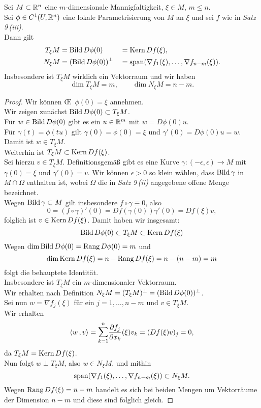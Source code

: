 \documentclass[skript.tex]{subfiles}
\begin{document}
	\begin{theorem}
		Sei $M\subset{\mathbb{R}^n}$ eine $m$-dimensionale Mannigfaltigkeit, $\xi \in M$, $m \leq n$.\\
		Sei $\phi \in C^1(U,{\mathbb{R}^n})$ eine lokale Parametrisierung von $M$ an $\xi$ und sei $f$ wie in \emph{Satz 9\,(iii)}.\\
		Dann gilt
		\begin{alignat*}{2}
			T_\xi M &= \operatorname{Bild} D\phi(0) &&=\operatorname{Kern} Df(\xi),\\
			N_\xi M &= (\operatorname{Bild} D\phi(0))^\perp &&=\operatorname{span}(\nabla f_1(\xi),\dotsc,\nabla f_{n-m}(\xi)).
		\end{alignat*}
		Insbesondere ist $T_\xi M$ wirklich ein Vektorraum und wir haben
		\[
			\dim T_\xi M = m, \qquad \dim N_\xi M = n-m.
		\]
	\end{theorem}
	\begin{proof}
		Wir können \OE\ $\phi(0) = \xi$ annehmen.\\
		Wir zeigen zunächst $\operatorname{Bild} D\phi(0) \subset T_\xi M$.\\
		Für $w\in\operatorname{Bild} D\phi(0)$ gibt es ein
		$u\in\mathbb{R}^m$ mit $w=D\phi(0)u$.\\
		Für $\gamma(t)=\phi(tu)$ gilt $\gamma(0) = \phi(0) = \xi$ und $\gamma'(0) = D\phi(0)u=w$.\\
		Damit ist $w \in T_\xi M$.\\
		Weiterhin ist $T_\xi M \subset \operatorname{Kern} Df(\xi)$.\\
		Sei hierzu $v \in T_\xi M$. Definitionsgemäß gibt es eine
		Kurve $\gamma \colon (-\epsilon,\epsilon) \to M$ mit $\gamma(0)=\xi$ und $\gamma'(0)=v$. Wir können $\epsilon>0$ so klein wählen, dass $\operatorname{Bild}\gamma$ in $M\cap\Omega$ enthalten ist, wobei $\Omega$ die
		in \emph{Satz 9\,(ii)} angegebene offene Menge bezeichnet.\\
		Wegen $\operatorname{Bild}\gamma \subset M$ gilt insbesondere
		$f\circ\gamma\equiv0$, also
		\[
			0 = (f\circ\gamma)'(0) = Df(\gamma(0))\gamma'(0) = Df(\xi)v,
		\]
		folglich ist $v \in \operatorname{Kern} Df(\xi)$. Damit haben wir insgesamt:
		\[
			\operatorname{Bild} D\phi(0) \subset T_\xi M \subset \operatorname{Kern} Df(\xi)
		\]
		Wegen $\dim\operatorname{Bild} D\phi(0) = \operatorname{\operatorname{Rang}} D\phi(0) = m$ und
		\[
			\dim\operatorname{Kern} Df(\xi) = n - \operatorname{\operatorname{Rang}} Df(\xi) = n-(n-m) = m
		\]
		folgt die behauptete Identität.\\
		Insbesondere ist $T_\xi M$ ein $m$-dimensionaler Vektorraum.\\
		Wir erhalten nach Definition $N_\xi M = (T_\xi M)^\perp
		= (\operatorname{Bild} D\phi(0))^\perp$.\\
		Sei nun $w = \nabla f_j(\xi)$ für ein $j=1,\dotsc,n-m$ und $v \in T_\xi M$.\\
		Wir erhalten
		\[
			\skp{w}{v} = \mathlarger\sum_{k=1}^n \ddel{f_j}{x_k}(\xi) v_k = (Df(\xi)v)_j = 0,
		\]
		da $T_\xi M = \operatorname{Kern} Df(\xi)$.\\
		Nun folgt $w \perp T_\xi M$, also $w \in N_\xi M$, und mithin
		\[
			\operatorname{span}(\nabla f_1(\xi),\dotsc,\nabla f_{n-m}(\xi)) \subset N_\xi M.
		\]
		Wegen $\operatorname{\operatorname{Rang}} Df(\xi) = n-m$ handelt es sich bei beiden Mengen um Vektorräume der Dimension $n-m$ und diese sind folglich gleich.
	\end{proof}
\end{document}
